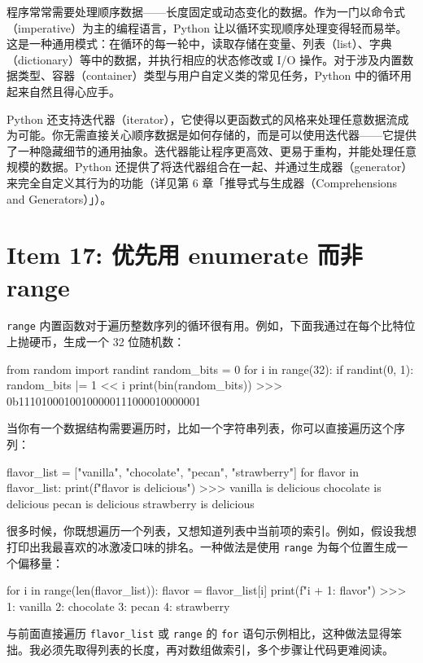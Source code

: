 程序常常需要处理顺序数据——长度固定或动态变化的数据。作为一门以命令式（imperative）为主的编程语言，Python 让以循环实现顺序处理变得轻而易举。这是一种通用模式：在循环的每一轮中，读取存储在变量、列表（list）、字典（dictionary）等中的数据，并执行相应的状态修改或 I/O 操作。对于涉及内置数据类型、容器（container）类型与用户自定义类的常见任务，Python 中的循环用起来自然且得心应手。

Python 还支持迭代器（iterator），它使得以更函数式的风格来处理任意数据流成为可能。你无需直接关心顺序数据是如何存储的，而是可以使用迭代器——它提供了一种隐藏细节的通用抽象。迭代器能让程序更高效、更易于重构，并能处理任意规模的数据。Python 还提供了将迭代器组合在一起、并通过生成器（generator）来完全自定义其行为的功能（详见第 6 章「推导式与生成器（Comprehensions and Generators）」）。

\section{Item 17: 优先用 enumerate 而非 range}

\texttt{range} 内置函数对于遍历整数序列的循环很有用。例如，下面我通过在每个比特位上抛硬币，生成一个 32 位随机数：

\begin{codebox}[python]
from random import randint
random_bits = 0
for i in range(32):
    if randint(0, 1):
        random_bits |= 1 << i
print(bin(random_bits))
>>>
0b11101000100100000111000010000001
\end{codebox}

当你有一个数据结构需要遍历时，比如一个字符串列表，你可以直接遍历这个序列：

\begin{codebox}[python]
flavor_list = ["vanilla", "chocolate", "pecan", "strawberry"]
for flavor in flavor_list:
    print(f"{flavor} is delicious")
>>>
vanilla is delicious
chocolate is delicious
pecan is delicious
strawberry is delicious
\end{codebox}

很多时候，你既想遍历一个列表，又想知道列表中当前项的索引。例如，假设我想打印出我最喜欢的冰激凌口味的排名。一种做法是使用 \texttt{range} 为每个位置生成一个偏移量：

\begin{codebox}[python]
for i in range(len(flavor_list)):
    flavor = flavor_list[i]
    print(f"{i + 1}: {flavor}")
>>>
1: vanilla
2: chocolate
3: pecan
4: strawberry
\end{codebox}

与前面直接遍历 \texttt{flavor\_list} 或 \texttt{range} 的 \texttt{for} 语句示例相比，这种做法显得笨拙。我必须先取得列表的长度，再对数组做索引，多个步骤让代码更难阅读。

